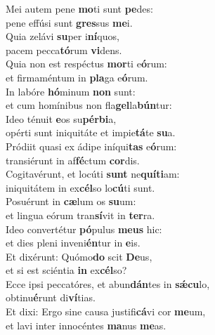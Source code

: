 \evenverse Mei autem pene \textbf{mo}ti sunt \textbf{pe}des:~\*\\
\evenverse pene effúsi sunt \textbf{gres}sus \textbf{me}i.\\
\oddverse Quia zelávi \textbf{su}per i\textbf{ní}quos,~\*\\
\oddverse pacem pecca\textbf{tó}rum \textbf{vi}dens.\\
\evenverse Quia non est respéctus \textbf{mor}ti e\textbf{ó}rum:~\*\\
\evenverse et firmaméntum in \textbf{pla}ga e\textbf{ó}rum.\\
\oddverse In labóre \textbf{hó}minum \textbf{non} sunt:~\*\\
\oddverse et cum homínibus non fla\textbf{gel}la\textbf{bún}tur:\\
\evenverse Ideo ténuit \textbf{e}os su\textbf{pér}\textbf{bi}a,~\*\\
\evenverse opérti sunt iniquitáte et impie\textbf{tá}te \textbf{su}a.\\
\oddverse Pródiit quasi ex ádipe iníqui\textbf{tas} e\textbf{ó}rum:~\*\\
\oddverse transiérunt in af\textbf{fé}ctum \textbf{cor}dis.\\
\evenverse Cogitavérunt, et locúti \textbf{sunt} ne\textbf{quí}\textbf{ti}am:~\*\\
\evenverse iniquitátem in ex\textbf{cél}so lo\textbf{cú}ti sunt.\\
\oddverse Posuérunt in \textbf{cæ}lum os \textbf{su}um:~\*\\
\oddverse et lingua eórum tran\textbf{sí}vit in \textbf{ter}ra.\\
\evenverse Ideo convertétur \textbf{pó}pulus \textbf{me}\textbf{us} hic:~\*\\
\evenverse et dies pleni inveni\textbf{én}tur in \textbf{e}is.\\
\oddverse Et dixérunt: Quómo\textbf{do} scit \textbf{De}us,~\*\\
\oddverse et si est sciéntia \textbf{in} ex\textbf{cél}so?\\
\evenverse Ecce ipsi peccatóres, et abun\textbf{dán}tes in \textbf{sǽ}\textbf{cu}lo,~\*\\
\evenverse obtinu\textbf{é}runt di\textbf{ví}tias.\\
\oddverse Et dixi: Ergo sine causa justifi\textbf{cá}vi cor \textbf{me}um,~\*\\
\oddverse et lavi inter innocéntes \textbf{ma}nus \textbf{me}as.\\
